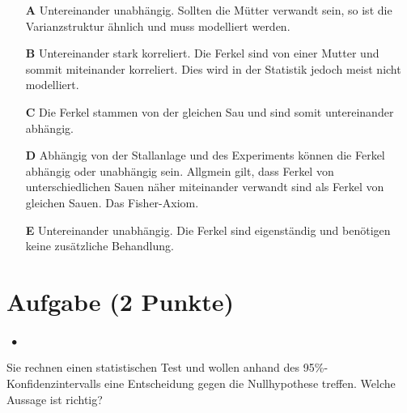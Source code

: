\documentclass[a4paper, 9pt]{scrartcl}\usepackage[]{graphicx}\usepackage[]{xcolor}
\begin{document}
\begin{enumerate}
\item [\textbf{A} \msquare] Untereinander unabhängig. Sollten die Mütter verwandt sein, so ist die Varianzstruktur ähnlich und muss modelliert werden.
\item [\textbf{B} \msquare] Untereinander stark korreliert. Die Ferkel sind von einer Mutter und sommit miteinander korreliert. Dies wird in der Statistik jedoch meist nicht modelliert.
\item [\textbf{C} \msquare] Die Ferkel stammen von der gleichen Sau und sind somit untereinander abhängig.
\item [\textbf{D} \msquare] Abhängig von der Stallanlage und des Experiments können die Ferkel abhängig oder unabhängig sein. Allgmein gilt, dass Ferkel von unterschiedlichen Sauen näher miteinander verwandt sind als Ferkel von gleichen Sauen. Das Fisher-Axiom.
\item [\textbf{E} \msquare] Untereinander unabhängig. Die Ferkel sind eigenständig und benötigen keine zusätzliche Behandlung.
\end{enumerate}

\section{Aufgabe \hfill (2 Punkte)}

\ifcollection
\begin{flushright}
\tiny\vspace{-2Ex}
\textbf{\examinhaltstart}
\exammodulestatversuch $\;\bullet$
\exammodulebiostat
\vspace{-1Ex}
\end{flushright}
\fi






Sie rechnen einen statistischen Test und wollen anhand des 95\%-Konfidenzintervalls eine Entscheidung gegen die Nullhypothese treffen. Welche Aussage ist richtig?
\end{document}
